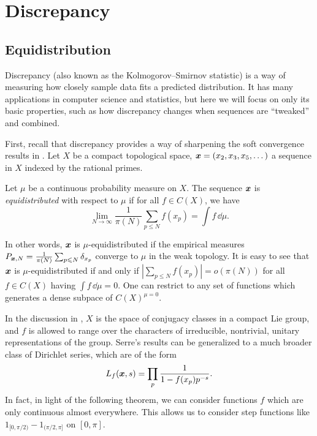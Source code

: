 
\chapter{Discrepancy}\label{ch2:discrepancy}





\section{Equidistribution}

Discrepancy (also known as the Kolmogorov--Smirnov statistic) is a way of 
measuring how closely sample data fits a predicted distribution. It has many 
applications in computer science and statistics, but here we will focus on only 
its basic properties, such as how discrepancy changes when sequences 
are ``tweaked'' and combined. 

First, recall that discrepancy provides a way of sharpening the soft 
convergence results in \cite[A.1]{serre-1989}. Let $X$ be a compact 
topological space, ${\boldsymbol x} = (x_2,x_3,x_5,\dots)$ a sequence in $X$ indexed by 
the rational primes. 

\begin{definition}
Let $\mu$ be a continuous probability measure on $X$. The sequence ${\boldsymbol x}$ is 
\emph{equidistributed} with respect to $\mu$ if for all $f\in C(X)$, we have 
\[
	\lim_{N\to \infty} \frac{1}{\pi(N)} \sum_{p\leqslant N} f(x_p) = \int f\, \dd \mu .
\]
\end{definition}

In other words, ${\boldsymbol x}$ is $\mu$-equidistributed if the empirical measures 
$P_{{\boldsymbol x},N} = \frac{1}{\pi(N)} \sum_{p\leqslant N} \delta_{x_p}$ converge to 
$\mu$ in the weak topology. It is easy to see that ${\boldsymbol x}$ is 
$\mu$-equidistributed if and only if 
$\left| \sum_{p\leqslant N} f(x_p)\right| = o(\pi(N))$ for all $f\in C(X)$ 
having $\int f\, \dd\mu = 0$. One can restrict to any set of functions which 
generates a dense subpace of $C(X)^{\mu = 0}$. 

In the discussion in \cite[A.1]{serre-1989}, $X$ is the space of conjugacy 
classes in a compact Lie group, and $f$ is allowed to range over the characters 
of irreducible, nontrivial, unitary representations of the group. Serre's 
results can be generalized to a much broader class of Dirichlet series, 
which are of the form 
\[
	L_f({\boldsymbol x},s) = \prod_p \frac{1}{1-f(x_p)p^{-s}} .
\]
In fact, in light of the following theorem, we can consider functions $f$ 
which are only continuous almost everywhere. This allows us to consider 
step functions like $1_{[0,\pi/2)} - 1_{(\pi/2,\pi]}$ on $[0,\pi]$. 

